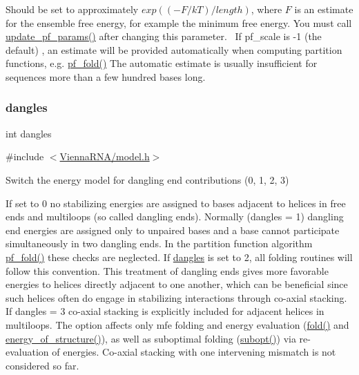 Should be set to approximately $exp{((-F/kT)/length)}$, where $F$ is an estimate for the ensemble free energy, for example the minimum free energy. You must call \hyperlink{group__pf__fold_ga384e927890f9c034ff09fa66da102d28}{update\+\_\+pf\+\_\+params()} after changing this parameter.~\newline
If pf\+\_\+scale is -\/1 (the default) , an estimate will be provided automatically when computing partition functions, e.\+g. \hyperlink{group__pf__fold_gadc3db3d98742427e7001a7fd36ef28c2}{pf\+\_\+fold()} The automatic estimate is usually insufficient for sequences more than a few hundred bases long. \mbox{\label{group__model__details_ga72b511ed1201f7e23ec437e468790d74}} 
\subsubsection{\texorpdfstring{dangles}{dangles}}
{\footnotesize\ttfamily int dangles}



{\ttfamily \#include $<$\hyperlink{model_8h}{Vienna\+R\+N\+A/model.\+h}$>$}



Switch the energy model for dangling end contributions (0, 1, 2, 3) 

If set to 0 no stabilizing energies are assigned to bases adjacent to helices in free ends and multiloops (so called dangling ends). Normally (dangles = 1) dangling end energies are assigned only to unpaired bases and a base cannot participate simultaneously in two dangling ends. In the partition function algorithm \hyperlink{group__pf__fold_gadc3db3d98742427e7001a7fd36ef28c2}{pf\+\_\+fold()} these checks are neglected. If \hyperlink{group__model__details_ga72b511ed1201f7e23ec437e468790d74}{dangles} is set to 2, all folding routines will follow this convention. This treatment of dangling ends gives more favorable energies to helices directly adjacent to one another, which can be beneficial since such helices often do engage in stabilizing interactions through co-\/axial stacking.~\newline
If dangles = 3 co-\/axial stacking is explicitly included for adjacent helices in multiloops. The option affects only mfe folding and energy evaluation (\hyperlink{group__mfe__fold__single_gaadafcb0f140795ae62e5ca027e335a9b}{fold()} and \hyperlink{group__eval_gaf93986cb3cb29770ec9cca69c9fab8cf}{energy\+\_\+of\+\_\+structure()}), as well as suboptimal folding (\hyperlink{group__subopt__wuchty_ga700f662506a233e42dd7fda74fafd40e}{subopt()}) via re-\/evaluation of energies. Co-\/axial stacking with one intervening mismatch is not considered so far.

